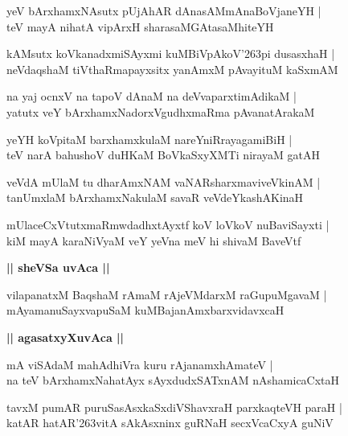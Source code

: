 \documentclass[twoside,12pt,openright]{book}
\def\S{\char'263}
\newcounter{shloka}[chapter]
\def\uvaca#1{\centerline{{\large\textbf{#1}}}}
\begin{document}
\begin{shloka}%
yeV bArxhamxNAsutx pUjAhAR dAnasAMmAnaBoVjaneYH |\\
teV mayA nihatA vipArxH sharasaMGAtasaMhiteYH 
\end{shloka}

\begin{shloka}%
kAMsutx koVkanadxmiSAyxmi kuMBiVpAkoV\S pi dusasxhaH |\\
neVdaqshaM tiVthaRmapayxsitx yanAmxM pAvayituM kaSxmAM 
\end{shloka}

\begin{shloka}%
na yaj ocnxV na tapoV dAnaM na deVvaparxtimAdikaM |\\
yatutx veY bArxhamxNadorxVgudhxmaRma pAvanatArakaM 
\end{shloka}

\begin{shloka}%
yeYH koVpitaM barxhamxkulaM nareYniRrayagamiBiH |\\
teV narA bahushoV duHKaM BoVkaSxyXMTi nirayaM gatAH 
\end{shloka}

\begin{shloka}%
veVdA mUlaM tu dharAmxNAM vaNARsharxmaviveVkinAM |\\
tanUmxlaM bArxhamxNakulaM savaR veVdeYkashAKinaH 
\end{shloka}

\begin{shloka}%
mUlaceCxVtutxmaRmwdadhxtAyxtf koV loVkoV nuBaviSayxti |\\
kiM mayA karaNiVyaM veY yeVna meV hi shivaM BaveVtf 
\end{shloka}

\uvaca{|| sheVSa uvAca ||}

\begin{shloka}%
vilapanatxM BaqshaM rAmaM rAjeVMdarxM raGupuMgavaM |\\
mAyamanuSayxvapuSaM kuMBajanAmxbarxvidavxcaH 
\end{shloka}

\uvaca{|| agasatxyXuvAca ||}

\begin{shloka}%
mA viSAdaM mahAdhiVra kuru rAjanamxhAmateV |\\
na teV bArxhamxNahatAyx sAyxdudxSATxnAM nAshamicaCxtaH 
\end{shloka}

\begin{shloka}%
tavxM pumAR puruSasAsxkaSxdiVShavxraH parxkaqteVH paraH |\\
katAR hatAR\S vitA sAkAsxninx guRNaH secxVcaCxyA guNiV 
\end{shloka}
\end{document}
